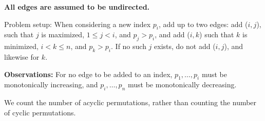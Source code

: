 \documentclass[letterpaper,12pt]{article}
\begin{document}
\textbf{All edges are assumed to be undirected.}


Problem setup: When considering a new index $p_i$, add up to two edges: add ($i, j$), such that
$j$ is maximized, $1 \le j < i$, and $p_j > p_i$, and add ($i, k$) such that $k$ is minimized,
$i < k \le n$, and $p_k > p_i$. 
If no such $j$ exists, do not add ($i, j$), and likewise for $k$.


\textbf{Observations:}
For no edge to be added to an index, $p_1, \ldots, p_i$ must be monotonically increasing, and 
$p_i, \ldots, p_n$ must be monotonically decreasing.

We count the number of acyclic permutations, rather than counting the number
of cyclic permutations.
\end{document}
